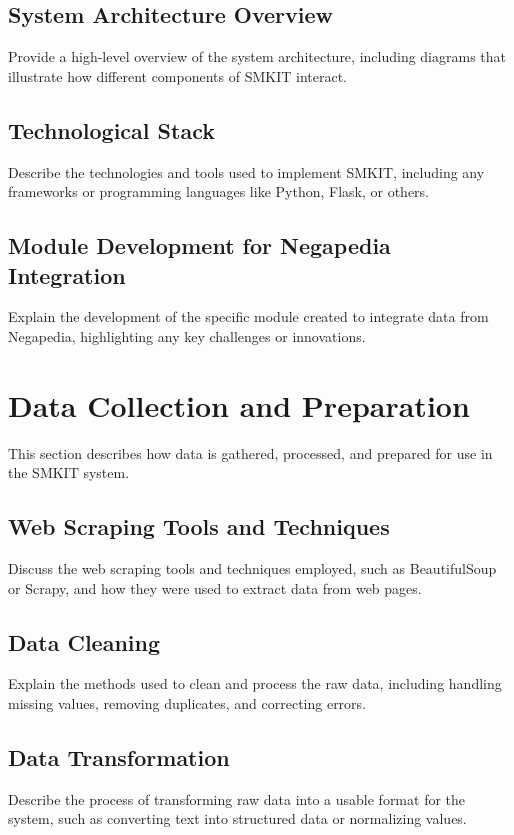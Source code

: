 \subsection{System Architecture Overview}
\label{subsec:system_architecture_overview}
Provide a high-level overview of the system architecture, including diagrams that illustrate how different components of SMKIT interact.

\subsection{Technological Stack}
\label{subsec:technological_stack}
Describe the technologies and tools used to implement SMKIT, including any frameworks or programming languages like Python, Flask, or others.

\subsection{Module Development for Negapedia Integration}
\label{subsec:module_development_negapedia}
Explain the development of the specific module created to integrate data from Negapedia, highlighting any key challenges or innovations.

\section{Data Collection and Preparation}
\label{sec:data_collection_preparation}
This section describes how data is gathered, processed, and prepared for use in the SMKIT system.

\subsection{Web Scraping Tools and Techniques}
\label{subsec:web_scraping_tools_techniques}
Discuss the web scraping tools and techniques employed, such as BeautifulSoup or Scrapy, and how they were used to extract data from web pages.

\subsection{Data Cleaning}
\label{subsec:data_cleaning}
Explain the methods used to clean and process the raw data, including handling missing values, removing duplicates, and correcting errors.

\subsection{Data Transformation}
\label{subsec:data_transformation}
Describe the process of transforming raw data into a usable format for the system, such as converting text into structured data or normalizing values.

